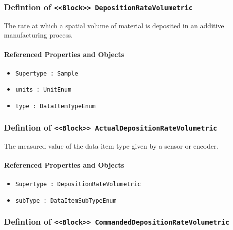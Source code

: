 \subsubsection{Defintion of \texttt{<<Block>> DepositionRateVolumetric}}
  \label{type:DepositionRateVolumetric}

\FloatBarrier

The rate at which a spatial volume of material is deposited in an additive manufacturing process.

\FloatBarrier
\paragraph{Referenced Properties and Objects}

\begin{itemize}
\item \texttt{Supertype : Sample}

\item \texttt{units : UnitEnum}

\item \texttt{type : DataItemTypeEnum}

\end{itemize}
\FloatBarrier
\subsubsection{Defintion of \texttt{<<Block>> ActualDepositionRateVolumetric}}
  \label{type:ActualDepositionRateVolumetric}

\FloatBarrier

The measured value of the data item type given by a sensor or encoder.

\FloatBarrier
\paragraph{Referenced Properties and Objects}

\begin{itemize}
\item \texttt{Supertype : DepositionRateVolumetric}

\item \texttt{subType : DataItemSubTypeEnum}

\end{itemize}
\FloatBarrier
\subsubsection{Defintion of \texttt{<<Block>> CommandedDepositionRateVolumetric}}
  \label{type:CommandedDepositionRateVolumetric}

